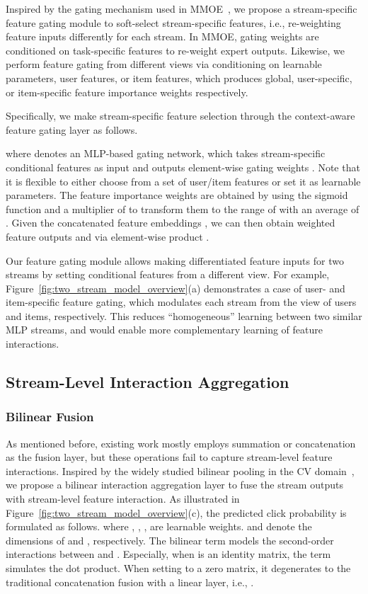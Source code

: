 \documentclass[letterpaper]{article} \usepackage{aaai23}  \usepackage{times}  \usepackage{helvet}  \usepackage{courier}  \usepackage[hyphens]{url}  \usepackage{graphicx} \urlstyle{rm} \def\UrlFont{\rm}  \usepackage{natbib}  \usepackage{caption} \frenchspacing  \setlength{\pdfpagewidth}{8.5in}  \setlength{\pdfpageheight}{11in}  \usepackage{algorithm}
\begin{document}
Inspired by the gating mechanism used in MMOE~\cite{MMoE}, we propose a stream-specific feature gating module to soft-select stream-specific features, i.e., re-weighting feature inputs differently for each stream. In MMOE, gating weights are conditioned on task-specific features to re-weight expert outputs. Likewise, we perform feature gating from different views via conditioning on learnable parameters, user features, or item features, which produces global, user-specific, or item-specific feature importance weights respectively. 



Specifically, we make stream-specific feature selection through the context-aware feature gating layer as follows.

where  denotes an MLP-based gating network, which takes stream-specific conditional features  as input and outputs element-wise gating weights . Note that it is flexible to either choose  from a set of user/item features or set it as learnable parameters. The feature importance weights are obtained by using the sigmoid function  and a multiplier of  to transform them to the range of  with an average of . Given the concatenated feature embeddings , we can then obtain weighted feature outputs  and  via element-wise product . 

Our feature gating module allows making differentiated feature inputs for two streams by setting conditional features  from a different view. For example, Figure~\ref{fig:two_stream_model_overview}(a) demonstrates a case of user- and item-specific feature gating, which modulates each stream from the view of users and items, respectively. This reduces ``homogeneous'' learning between two similar MLP streams, and would enable more complementary learning of feature interactions.


\subsection{Stream-Level Interaction Aggregation}
\subsubsection{Bilinear Fusion} As mentioned before, existing work mostly employs summation or concatenation as the fusion layer, but these operations fail to capture stream-level feature interactions. Inspired by the widely studied bilinear pooling in the CV domain~\cite{BilinearCNN,BilinearModel}, we propose a bilinear interaction aggregation layer to fuse the stream outputs
with stream-level feature interaction. As illustrated in Figure~\ref{fig:two_stream_model_overview}(c), the predicted click probability is formulated as follows.
\label{equ:bilinear}
where , , ,  are learnable weights.  and  denote the dimensions of  and , respectively.
The bilinear term  models the second-order interactions between  and . Especially, when  is an identity matrix, the term simulates the dot product. When setting  to a zero matrix, it degenerates to the traditional concatenation fusion with a linear layer, i.e., . 
\end{document}
